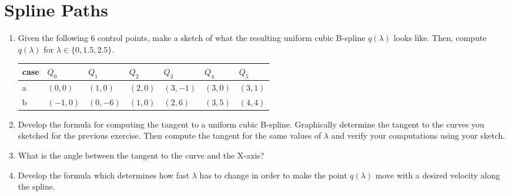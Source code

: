 \documentclass[a4paper]{article}
\begin{document}
\section*{Spline Paths}

\begin{enumerate}
  
\item
  Given the following 6 control points, make a sketch of what the resulting uniform cubic B-spline $q(\lambda)$ looks like.
  Then, compute $q(\lambda)$ for $\lambda\in\{0, 1.5, 2.5\}$.
  
  \begin{center}
    \begin{tabular}{lllllll}
      \toprule
      case & $Q_0$ & $Q_1$ & $Q_2$ & $Q_3$ & $Q_4$ & $Q_5$ \\
      \midrule
      a & $( 0, 0)$ & $(1,  0)$ & $(2, 0)$ & $(3, -1)$ & $(3, 0)$ & $(3, 1)$ \\
      b & $(-1, 0)$ & $(0, -6)$ & $(1, 0)$ & $(2,  6)$ & $(3, 5)$ & $(4, 4)$ \\
      \bottomrule
    \end{tabular}
  \end{center}
  
\item
  Develop the formula for computing the tangent to a uniform cubic B-spline.
  Graphically determine the tangent to the curves you sketched for the previous exercise.
  Then compute the tangent for the same values of $\lambda$ and verify your computations using your sketch.

\item
  What is the angle between the tangent to the curve and the X-axis?

\item
  Develop the formula which determines how fast $\lambda$ has to change in order to make the point $q(\lambda)$ move with a desired velocity along the spline.
  
\end{enumerate}
\end{document}
